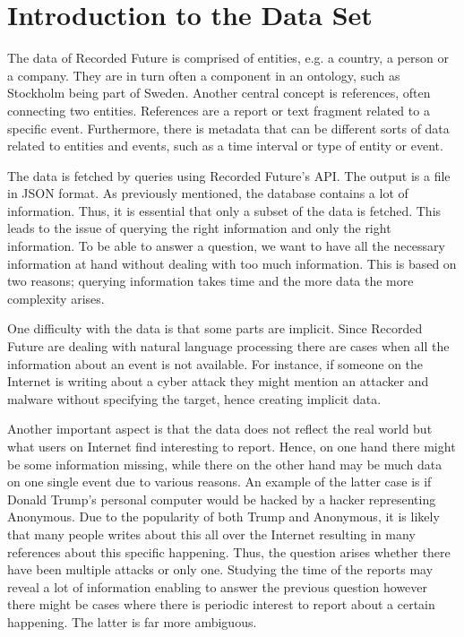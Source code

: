 \section{Introduction to the Data Set}
The data of Recorded Future is comprised of entities, e.g. a country, a person or a company. They are in turn often a component in an ontology, such as Stockholm being part of Sweden. Another central concept is references, often connecting two entities. References are a report or text fragment related to a specific event. Furthermore, there is metadata that can be different sorts of data related to entities and events, such as a time interval or type of entity or event. %

The data is fetched by queries using Recorded Future's API. The output is a file in JSON format. As previously mentioned, the database contains a lot of information. Thus, it is essential that only a subset of the data is fetched. This leads to the issue of querying the right information and only the right information. To be able to answer a question, we want to have all the necessary information at hand without dealing with too much information. This is based on two reasons; querying information takes time and the more data the more complexity arises.

One difficulty with the data is that some parts are implicit. Since Recorded Future are dealing with natural language processing there are cases when all the information about an event is not available. For instance, if someone on the Internet is writing about a cyber attack they might mention an attacker and malware without specifying the target, hence creating implicit data. 

Another important aspect is that the data does not reflect the real world but what users on Internet find interesting to report. Hence, on one hand there might be some information missing, while there on the other hand may be much data on one single event due to various reasons. An example of the latter case is if Donald Trump's personal computer would be hacked by a hacker representing Anonymous. Due to the popularity of both Trump and Anonymous, it is likely that many people writes about this all over the Internet resulting in many references about this specific happening. Thus, the question arises whether there have been multiple attacks or only one. Studying the time of the reports may reveal a lot of information enabling to answer the previous question however there might be cases where there is periodic interest to report about a certain happening. The latter is far more ambiguous.

